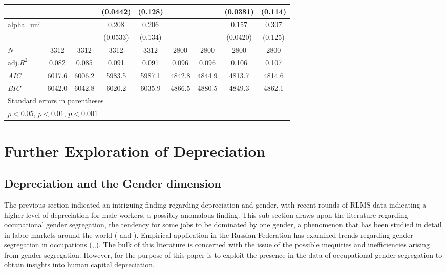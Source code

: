 \documentclass[alpha-refs]{wiley-article-02b}
\begin{document}
\begin{table}[htbp!]
\begin{tabular}{l*{8}{c}}
		&&&(0.0442)&(0.128)&&&(0.0381)&(0.114)\\
		\hline
		alpha\_uni&&&0.208\sym{***}&0.206&&&0.157\sym{***}&0.307\sym{*}\\
		&&&(0.0533)&(0.134)&&&(0.0420)&(0.125)\\
		\hline
		\(N\)&3312&3312&3312&3312&2800&2800&2800&2800\\
		adj.\(R^{2}\)&0.082&0.085&0.091&0.091&0.096&0.096&0.106&0.107\\
		\textit{AIC}&6017.6&6006.2&5983.5&5987.1&4842.8&4844.9&4813.7&4814.6\\
		\textit{BIC}&6042.0&6042.8&6020.2&6035.9&4866.5&4880.5&4849.3&4862.1\\
		\bottomrule
		\multicolumn{9}{l}{\footnotesize Standard errors in parentheses}\\
		\multicolumn{9}{l}{\footnotesize \sym{*} \(p<0.05\), \sym{**} \(p<0.01\), \sym{***} \(p<0.001\)}\\
	\end{tabular}
\end{table}


\section{Further Exploration of Depreciation}
\subsection{Depreciation and the Gender dimension}

The previous section indicated an intriguing finding regarding depreciation 
and gender, with recent rounds of RLMS data indicating a higher level of 
depreciation for male workers, a possibly anomalous finding. This 
sub-section draws upon the literature regarding occupational gender 
segregation, the tendency for some jobs to be dominated by one gender, a 
phenomenon that has been studied in detail in labor markets around the 
world (\citet{Preston_1999} and \citet{Blau_2013}). Empirical application 
in the Russian Federation has examined trends regarding gender segregation 
in occupations 
(\citet{Klimova_2009},\citet{Klimova_2012},\citet{Kosyakova_2015}). The 
bulk of this literature is concerned with the issue of the possible 
inequities and inefficiencies arising from gender segregation. However, for 
the purpose of this paper is to exploit the presence in the data of 
occupational gender segregation to obtain insights into human capital 
depreciation.
\end{document}

